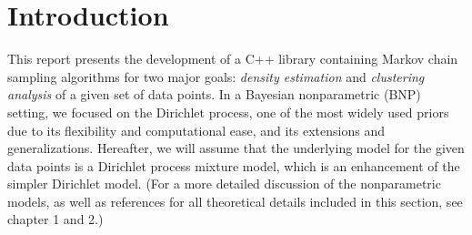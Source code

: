 
\chapter{Introduction}
This report presents the development of a C++ library containing Markov chain sampling algorithms for two major goals: \emph{density estimation} and \emph{clustering analysis} of a given set of data points.
In a Bayesian nonparametric (BNP) setting, we focused on the Dirichlet process, one of the most widely used priors due to its flexibility and computational ease, and its extensions and generalizations.
Hereafter, we will assume that the underlying model for the given data points is a Dirichlet process mixture model, which is an enhancement of the simpler Dirichlet model.
(For a more detailed discussion of the nonparametric models, as well as references for all theoretical details included in this section, see \cite{book} chapter 1 and 2.)


